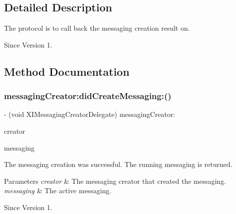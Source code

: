 \subsection{Detailed Description}
The protocol is to call back the messaging creation result on. 

\begin{DoxySince}{Since}
Version 1. 
\end{DoxySince}


\subsection{Method Documentation}
\hypertarget{protocol_x_i_messaging_creator_delegate_01-p_adb133e0f0103fd9c782f5dcb444093e8}{}\label{protocol_x_i_messaging_creator_delegate_01-p_adb133e0f0103fd9c782f5dcb444093e8} 
\subsubsection{\texorpdfstring{messaging\+Creator\+:did\+Create\+Messaging\+:()}{messagingCreator:didCreateMessaging:()}}
{\footnotesize\ttfamily -\/ (void X\+I\+Messaging\+Creator\+Delegate) messaging\+Creator\+: \begin{DoxyParamCaption}\item[{(id$<$ X\+I\+Messaging\+Creator $>$)}]{creator }\item[{didCreateMessaging:(id$<$ X\+I\+Messaging $>$)}]{messaging }\end{DoxyParamCaption}}



The messaging creation was successful. The running messaging is returned. 


\begin{DoxyParams}{Parameters}
{\em creator} & The messaging creator that created the messaging. \\
\hline
{\em messaging} & The active messaging. \\
\hline
\end{DoxyParams}
\begin{DoxySince}{Since}
Version 1. 
\end{DoxySince}
\hypertarget{protocol_x_i_messaging_creator_delegate_01-p_ab6785dae82b6fe547d4b19ed56d5a5cd}{}\label{protocol_x_i_messaging_creator_delegate_01-p_ab6785dae82b6fe547d4b19ed56d5a5cd} 
